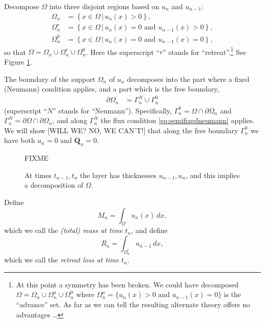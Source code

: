 \documentclass[final,leqno,onefignum,onetabnum]{siamltex1213bueler}
\newcommand\bQ{\mathbf{Q}}
\begin{document}
Decompose $\Omega$ into three disjoint regions based on $u_n$ and $u_{n-1}$:
\begin{align*}
\Omega_n &= \left\{x \in \Omega \,\big|\, u_n(x)>0\right\}, \\
\Omega_n^r &= \left\{x \in \Omega \,\big|\, u_n(x)=0 \text{ and } u_{n-1}(x) > 0\right\}, \\
\Omega_n^0 &= \left\{x \in \Omega \,\big|\, u_n(x)=0 \text{ and } u_{n-1}(x) = 0\right\},
\end{align*}
so that $\Omega = \Omega_n \cup \Omega_n^r \cup \Omega_n^0$.  Here the superscript ``$r$'' stands for ``retreat''.\footnote{At this point a symmetry has been broken.  We could have decomposed $\Omega= \Omega_n \cup \Omega_n^a \cup \Omega_n^0$ where $\Omega_n^a = \{u_n(x) > 0 \text{ and } u_{n-1}(x) = 0\}$ is the ``advance'' set.  As far as we can tell the resulting alternate theory offers no advantages \dots}  See Figure \ref{fig:domains}.

The boundary of the support $\Omega_n$ of $u_n$ decomposes into the part where a fixed (Neumann) condition applies, and a part which is the free boundary,
\begin{align*}
\partial\Omega_n &= \Gamma_n^N \cup \Gamma_n^0
\end{align*}
(superscript ``$N$'' stands for ``Neumann'').  Specifically, $\Gamma_n^0 = \Omega \cap \partial \Omega_n$ and $\Gamma_n^N = \partial \Omega \cap \partial \Omega_n$, and along $\Gamma_n^N$ the flux condition \eqref{eq:semifixedneumann} applies.  We will show [WILL WE?  NO, WE CAN'T!] that along the free boundary $\Gamma_n^0$ we have both $u_n=0$ and $\bQ_n = 0$.

\begin{figure}[ht]
\vspace{1.0in}
\centerline{FIXME}
\vspace{1.0in}
\caption{At times $t_{n-1},t_n$ the layer has thicknesses $u_{n-1},u_n$, and this implies a decomposition of $\Omega$.}
\label{fig:domains}
\end{figure}

Define
\begin{equation}
M_n = \int_\Omega u_n(x)\,dx,
\end{equation}
which we call the \emph{(total) mass at time} $t_n$, and define
\begin{equation}
R_n = \int_{\Omega_n^r} u_{n-1}\,dx,
\end{equation}
which we call the \emph{retreat loss at time} $t_n$.
\end{document}
